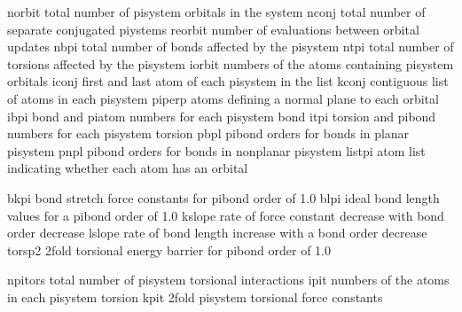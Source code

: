 \documentclass[letterpaper,11pt,english]{sphinxmanual}
\begin{document}
\begin{sphinxVerbatim}[commandchars=\\\{\}]
norbit          total number of pisystem orbitals in the system
nconj           total number of separate conjugated piystems
reorbit         number of evaluations between orbital updates
nbpi            total number of bonds affected by the pisystem
ntpi            total number of torsions affected by the pisystem
iorbit          numbers of the atoms containing pisystem orbitals
iconj           first and last atom of each pisystem in the list
kconj           contiguous list of atoms in each pisystem
piperp          atoms defining a normal plane to each orbital
ibpi            bond and piatom numbers for each pisystem bond
itpi            torsion and pibond numbers for each pisystem torsion
pbpl            pi\PYGZhy{}bond orders for bonds in \PYGZdq{}planar\PYGZdq{} pisystem
pnpl            pi\PYGZhy{}bond orders for bonds in \PYGZdq{}nonplanar\PYGZdq{} pisystem
listpi          atom list indicating whether each atom has an orbital
\end{sphinxVerbatim}


\begin{sphinxVerbatim}[commandchars=\\\{\}]
bkpi            bond stretch force constants for pi\PYGZhy{}bond order of 1.0
blpi            ideal bond length values for a pi\PYGZhy{}bond order of 1.0
kslope          rate of force constant decrease with bond order decrease
lslope          rate of bond length increase with a bond order decrease
torsp2          2\PYGZhy{}fold torsional energy barrier for pi\PYGZhy{}bond order of 1.0
\end{sphinxVerbatim}


\begin{sphinxVerbatim}[commandchars=\\\{\}]
npitors         total number of pi\PYGZhy{}system torsional interactions
ipit            numbers of the atoms in each pi\PYGZhy{}system torsion
kpit            2\PYGZhy{}fold pi\PYGZhy{}system torsional force constants
\end{sphinxVerbatim}

\end{document}
